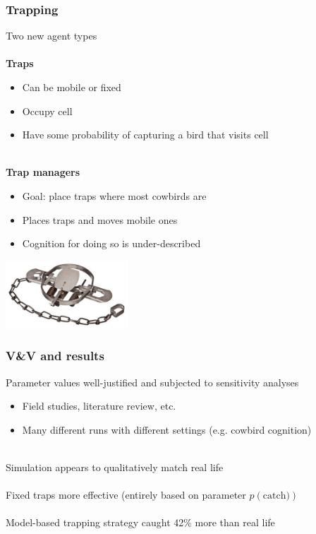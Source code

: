 \documentclass{beamer}
\begin{document}
\begin{frame}
	\frametitle{Trapping}
	Two new agent types \\~\\
	
	\textbf{Traps} 
	\begin{itemize}
		\item \small Can be mobile or fixed
		\item \small Occupy cell
		\item \small Have some probability of capturing a bird that visits cell \\~\\
	\end{itemize}
	
	\textbf{Trap managers}
	\begin{itemize}
		\item \small Goal: place traps where most cowbirds are
		\item \small Places traps and moves mobile ones
		\item \small Cognition for doing so is under-described
	\end{itemize}

	\begin{center}
		\includegraphics[height=1.0in, keepaspectratio]{trap.jpeg}
	\end{center}

\end{frame}

\begin{frame}
	\frametitle{V\&V and results}
	
	Parameter values well-justified and subjected to sensitivity analyses
	\begin{itemize}
		\item \small Field studies, literature review, etc.
		\item \small Many different runs with different settings (e.g. cowbird cognition) \\~\\
	\end{itemize}

	Simulation appears to qualitatively match real life \\~\\

	Fixed traps more effective (entirely based on parameter $p(\mathrm{catch)})$\\~\\

	Model-based trapping strategy caught 42\% more than real life
\end{frame}
\end{document}
